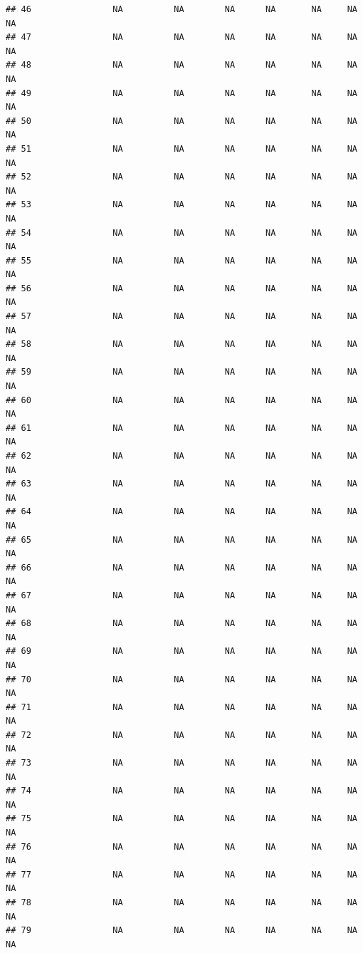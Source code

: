 \documentclass[
]{article}
\begin{document}
\begin{verbatim}
## 46                NA          NA        NA      NA       NA     NA     NA
## 47                NA          NA        NA      NA       NA     NA     NA
## 48                NA          NA        NA      NA       NA     NA     NA
## 49                NA          NA        NA      NA       NA     NA     NA
## 50                NA          NA        NA      NA       NA     NA     NA
## 51                NA          NA        NA      NA       NA     NA     NA
## 52                NA          NA        NA      NA       NA     NA     NA
## 53                NA          NA        NA      NA       NA     NA     NA
## 54                NA          NA        NA      NA       NA     NA     NA
## 55                NA          NA        NA      NA       NA     NA     NA
## 56                NA          NA        NA      NA       NA     NA     NA
## 57                NA          NA        NA      NA       NA     NA     NA
## 58                NA          NA        NA      NA       NA     NA     NA
## 59                NA          NA        NA      NA       NA     NA     NA
## 60                NA          NA        NA      NA       NA     NA     NA
## 61                NA          NA        NA      NA       NA     NA     NA
## 62                NA          NA        NA      NA       NA     NA     NA
## 63                NA          NA        NA      NA       NA     NA     NA
## 64                NA          NA        NA      NA       NA     NA     NA
## 65                NA          NA        NA      NA       NA     NA     NA
## 66                NA          NA        NA      NA       NA     NA     NA
## 67                NA          NA        NA      NA       NA     NA     NA
## 68                NA          NA        NA      NA       NA     NA     NA
## 69                NA          NA        NA      NA       NA     NA     NA
## 70                NA          NA        NA      NA       NA     NA     NA
## 71                NA          NA        NA      NA       NA     NA     NA
## 72                NA          NA        NA      NA       NA     NA     NA
## 73                NA          NA        NA      NA       NA     NA     NA
## 74                NA          NA        NA      NA       NA     NA     NA
## 75                NA          NA        NA      NA       NA     NA     NA
## 76                NA          NA        NA      NA       NA     NA     NA
## 77                NA          NA        NA      NA       NA     NA     NA
## 78                NA          NA        NA      NA       NA     NA     NA
## 79                NA          NA        NA      NA       NA     NA     NA

\end{verbatim}
\end{document}
